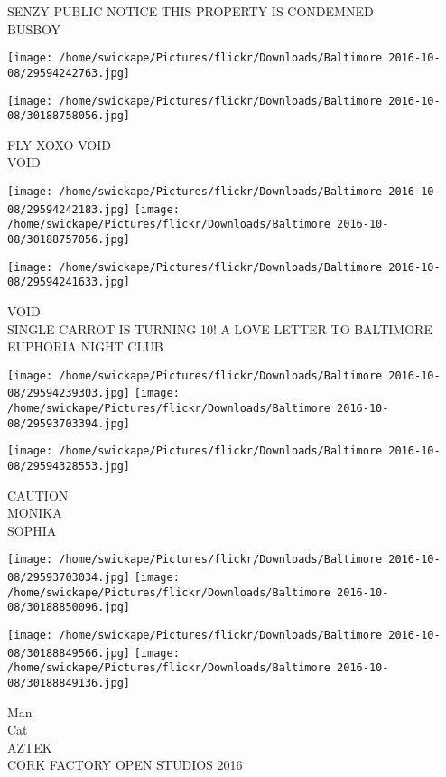 \documentclass[10pt,letterpaper]{article}
\begin{document}
SENZY PUBLIC NOTICE THIS PROPERTY IS CONDEMNED\\
BUSBOY
\pagebreak

\texttt{[image: /home/swickape/Pictures/flickr/Downloads/Baltimore 2016-10-08/29594242763.jpg]}

\vspace{0.25in}
\texttt{[image: /home/swickape/Pictures/flickr/Downloads/Baltimore 2016-10-08/30188758056.jpg]}

FLY XOXO VOID\\
VOID
\pagebreak

\texttt{[image: /home/swickape/Pictures/flickr/Downloads/Baltimore 2016-10-08/29594242183.jpg]}
\texttt{[image: /home/swickape/Pictures/flickr/Downloads/Baltimore 2016-10-08/30188757056.jpg]}

\vspace{0.25in}
\texttt{[image: /home/swickape/Pictures/flickr/Downloads/Baltimore 2016-10-08/29594241633.jpg]}

VOID\\
SINGLE CARROT IS TURNING 10! A LOVE LETTER TO BALTIMORE\\
EUPHORIA NIGHT CLUB
\pagebreak

\texttt{[image: /home/swickape/Pictures/flickr/Downloads/Baltimore 2016-10-08/29594239303.jpg]}
\texttt{[image: /home/swickape/Pictures/flickr/Downloads/Baltimore 2016-10-08/29593703394.jpg]}

\vspace{0.25in}
\texttt{[image: /home/swickape/Pictures/flickr/Downloads/Baltimore 2016-10-08/29594328553.jpg]}

CAUTION\\
MONIKA\\
SOPHIA
\pagebreak

\texttt{[image: /home/swickape/Pictures/flickr/Downloads/Baltimore 2016-10-08/29593703034.jpg]}
\texttt{[image: /home/swickape/Pictures/flickr/Downloads/Baltimore 2016-10-08/30188850096.jpg]}

\texttt{[image: /home/swickape/Pictures/flickr/Downloads/Baltimore 2016-10-08/30188849566.jpg]}
\texttt{[image: /home/swickape/Pictures/flickr/Downloads/Baltimore 2016-10-08/30188849136.jpg]}

Man\\
Cat\\
AZTEK\\
CORK FACTORY OPEN STUDIOS 2016
\pagebreak
\end{document}
